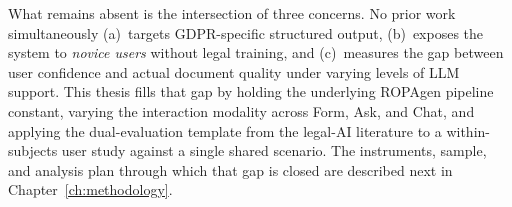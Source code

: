 What remains absent is the intersection of three concerns. No prior work simultaneously (a)~targets GDPR-specific structured output, (b)~exposes the system to \emph{novice users} without legal training, and (c)~measures the gap between user confidence and actual document quality under varying levels of LLM support. This thesis fills that gap by holding the underlying ROPAgen pipeline constant, varying the interaction modality across Form, Ask, and Chat, and applying the dual-evaluation template from the legal-AI literature to a within-subjects user study against a single shared scenario. The instruments, sample, and analysis plan through which that gap is closed are described next in Chapter~\ref{ch:methodology}.
